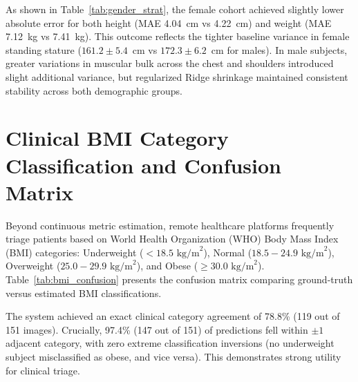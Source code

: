 \documentclass[12pt,a4paper,oneside]{report}
\begin{document}
As shown in Table~\ref{tab:gender_strat}, the female cohort achieved slightly lower absolute error for both height (MAE 4.04~cm vs 4.22~cm) and weight (MAE 7.12~kg vs 7.41~kg). This outcome reflects the tighter baseline variance in female standing stature ($161.2 \pm 5.4$~cm vs $172.3 \pm 6.2$~cm for males). In male subjects, greater variations in muscular bulk across the chest and shoulders introduced slight additional variance, but regularized Ridge shrinkage maintained consistent stability across both demographic groups.

\section{Clinical BMI Category Classification and Confusion Matrix}
Beyond continuous metric estimation, remote healthcare platforms frequently triage patients based on World Health Organization (WHO) Body Mass Index (BMI) categories: Underweight ($<18.5\text{ kg/m}^2$), Normal ($18.5 - 24.9\text{ kg/m}^2$), Overweight ($25.0 - 29.9\text{ kg/m}^2$), and Obese ($\ge 30.0\text{ kg/m}^2$). Table~\ref{tab:bmi_confusion} presents the confusion matrix comparing ground-truth versus estimated BMI classifications.

\begin{table}[H]
\centering
\caption{Clinical BMI Category Classification Confusion Matrix ($N=151$ Images)}
\label{tab:bmi_confusion}
\end{table}

The system achieved an exact clinical category agreement of 78.8\% (119 out of 151 images). Crucially, 97.4\% (147 out of 151) of predictions fell within $\pm 1$ adjacent category, with zero extreme classification inversions (no underweight subject misclassified as obese, and vice versa). This demonstrates strong utility for clinical triage.
\end{document}
